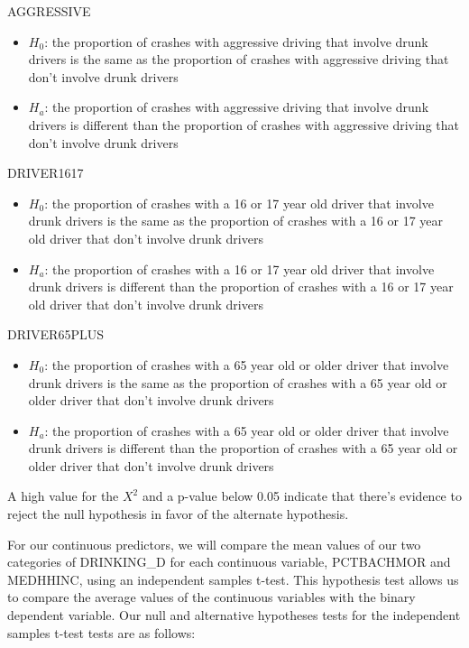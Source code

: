 \documentclass[
]{article}
\providecommand{\tightlist}{%
  \setlength{\itemsep}{0pt}\setlength{\parskip}{0pt}}
\begin{document}
AGGRESSIVE

\begin{itemize}
\tightlist
\item
  \(H_0\): the proportion of crashes with aggressive driving that
  involve drunk drivers is the same as the proportion of crashes with
  aggressive driving that don't involve drunk drivers
\item
  \(H_a\): the proportion of crashes with aggressive driving that
  involve drunk drivers is different than the proportion of crashes with
  aggressive driving that don't involve drunk drivers
\end{itemize}

DRIVER1617

\begin{itemize}
\tightlist
\item
  \(H_0\): the proportion of crashes with a 16 or 17 year old driver
  that involve drunk drivers is the same as the proportion of crashes
  with a 16 or 17 year old driver that don't involve drunk drivers
\item
  \(H_a\): the proportion of crashes with a 16 or 17 year old driver
  that involve drunk drivers is different than the proportion of crashes
  with a 16 or 17 year old driver that don't involve drunk drivers
\end{itemize}

DRIVER65PLUS

\begin{itemize}
\tightlist
\item
  \(H_0\): the proportion of crashes with a 65 year old or older driver
  that involve drunk drivers is the same as the proportion of crashes
  with a 65 year old or older driver that don't involve drunk drivers
\item
  \(H_a\): the proportion of crashes with a 65 year old or older driver
  that involve drunk drivers is different than the proportion of crashes
  with a 65 year old or older driver that don't involve drunk drivers
\end{itemize}

A high value for the \(X^2\) and a p-value below 0.05 indicate that
there's evidence to reject the null hypothesis in favor of the alternate
hypothesis.

For our continuous predictors, we will compare the mean values of our
two categories of DRINKING\_D for each continuous variable, PCTBACHMOR
and MEDHHINC, using an independent samples t-test. This hypothesis test
allows us to compare the average values of the continuous variables with
the binary dependent variable. Our null and alternative hypotheses tests
for the independent samples t-test tests are as follows:
\end{document}

